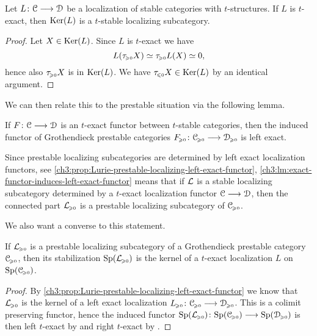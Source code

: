 \begin{lemma}
    \label{ch3:lm:t-exact-then-t-stable-kernel}
    Let $L\:\C\to\D$ be a localization of stable categories with $t$-structures. If $L$ is $t$-exact, then $\Ker(L)$ is a $t$-stable localizing subcategory.  
\end{lemma}
\begin{proof}
    Let $X\in \Ker(L)$. Since $L$ is $t$-exact we have 
    \[L(\tau\geqz X)\simeq \tau\geqz L(X)\simeq 0,\] 
    hence also $\tau\geqz X$ is in $\Ker(L)$. We have $\tau\leqz X\in \Ker(L)$ by an identical argument.  
\end{proof}

We can then relate this to the prestable situation via the following lemma. 

\begin{lemma}
    \label{ch3:lm:exact-functor-induces-left-exact-functor}
    If $F\:\C\to \D$ is an $t$-exact functor between $t$-stable categories, then the induced functor of Grothendieck prestable categories $F\geqz\:\C\geqz\to\D\geqz$ is left exact. 
\end{lemma}

\begin{remark}
    \label{ch3:rm:kernel-of-t-exact-then-prestable-localizing}
    Since prestable localizing subcategories are determined by left exact localization functors, see \cref{ch3:prop:Lurie-prestable-localizing-left-exact-functor}, \cref{ch3:lm:exact-functor-induces-left-exact-functor} means that if $\L$ is a stable localizing subcategory determined by a $t$-exact localization functor $\C\to \D$, then the connected part $\L\geqz$ is a prestable localizing subcategory of $\C\geqz$. 
\end{remark}

We also want a converse to this statement.

\begin{lemma}
    \label{ch3:lm:prestable-localizing-then-kernel-of-t-exact}
    If $\L\geqz$ is a prestable localizing subcategory of a Grothendieck prestable category $\C\geqz$, then its stabilization $\Sp(\L\geqz)$ is the kernel of a $t$-exact localization $L$ on $\Sp(\C\geqz)$.  
\end{lemma}
\begin{proof}
    By \cref{ch3:prop:Lurie-prestable-localizing-left-exact-functor} we know that $\L\geqz$ is the kernel of a left exact localization $L\geqz \: \C\geqz \to \D\geqz$. This is a colimit preserving functor, hence the induced functor $\Sp(\L\geqz)\:\Sp(\C\geqz)\to \Sp(\D\geqz)$ is then left $t$-exact by \cite[C.3.2.1]{lurie_SAG} and right $t$-exact by \cite[C.3.1.1]{lurie_SAG}. 
\end{proof}

